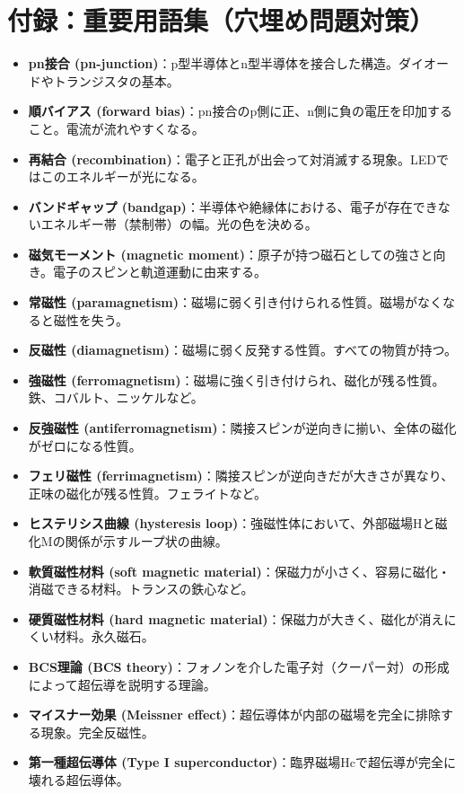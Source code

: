 \documentclass[11pt,a4paper]{ltjsarticle}
\begin{document}
\section*{付録：重要用語集（穴埋め問題対策）}
\begin{itemize}
    \item \textbf{pn接合 (pn-junction)}：p型半導体とn型半導体を接合した構造。ダイオードやトランジスタの基本。
    \item \textbf{順バイアス (forward bias)}：pn接合のp側に正、n側に負の電圧を印加すること。電流が流れやすくなる。
    \item \textbf{再結合 (recombination)}：電子と正孔が出会って対消滅する現象。LEDではこのエネルギーが光になる。
    \item \textbf{バンドギャップ (bandgap)}：半導体や絶縁体における、電子が存在できないエネルギー帯（禁制帯）の幅。光の色を決める。
    \item \textbf{磁気モーメント (magnetic moment)}：原子が持つ磁石としての強さと向き。電子のスピンと軌道運動に由来する。
    \item \textbf{常磁性 (paramagnetism)}：磁場に弱く引き付けられる性質。磁場がなくなると磁性を失う。
    \item \textbf{反磁性 (diamagnetism)}：磁場に弱く反発する性質。すべての物質が持つ。
    \item \textbf{強磁性 (ferromagnetism)}：磁場に強く引き付けられ、磁化が残る性質。鉄、コバルト、ニッケルなど。
    \item \textbf{反強磁性 (antiferromagnetism)}：隣接スピンが逆向きに揃い、全体の磁化がゼロになる性質。
    \item \textbf{フェリ磁性 (ferrimagnetism)}：隣接スピンが逆向きだが大きさが異なり、正味の磁化が残る性質。フェライトなど。
    \item \textbf{ヒステリシス曲線 (hysteresis loop)}：強磁性体において、外部磁場Hと磁化Mの関係が示すループ状の曲線。
    \item \textbf{軟質磁性材料 (soft magnetic material)}：保磁力が小さく、容易に磁化・消磁できる材料。トランスの鉄心など。
    \item \textbf{硬質磁性材料 (hard magnetic material)}：保磁力が大きく、磁化が消えにくい材料。永久磁石。
    \item \textbf{BCS理論 (BCS theory)}：フォノンを介した電子対（クーパー対）の形成によって超伝導を説明する理論。
    \item \textbf{マイスナー効果 (Meissner effect)}：超伝導体が内部の磁場を完全に排除する現象。完全反磁性。
    \item \textbf{第一種超伝導体 (Type I superconductor)}：臨界磁場Hcで超伝導が完全に壊れる超伝導体。

\end{itemize}
\end{document}
